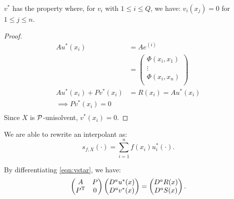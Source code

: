 \documentclass[twoside]{memoir}
\begin{document}
\begin{lem}
	$v^*$ has the property where, for $v_i$ with $1 \leq i \leq Q$, we have: $v_i(x_j) = 0$ for $1 \leq j \leq n$.
\end{lem}
\begin{proof}
	\begin{equation*}
	\begin{split}
	A u^*(x_i) &= A e^{(i)} \\
	&= \begin{pmatrix}
	\Phi(x_i, x_1) \\  \vdots \\ \Phi(x_i, x_n)\\
	\end{pmatrix} \\
	A u^*(x_i) + P v^*(x_i) &= R(x_i) = A u^*(x_i) \\
	\implies P v^*(x_i) = 0 \\
	\end{split}
	\end{equation*}
	Since $X$ is $\mathcal{P}$-unisolvent, $v^*(x_i) = 0$.
\end{proof}
We are able to rewrite an interpolant as:
\begin{equation} \label{eqn:InterDecomp}
s_{f,X}(\cdot) = \sum_{i=1}^{n} f(x_i)u_i^*(\cdot).
\end{equation}

By differentiating \ref{eqn:vstar}, we have:
\begin{equation}
\begin{pmatrix}
A & P \\
P^{\text{T}} & 0 \\
\end{pmatrix}
\begin{pmatrix}
D^a u^*(x)\\ D^a v^*(x)
\end{pmatrix}
=
\begin{pmatrix}
D^a R(x)\\ D^a S(x)
\end{pmatrix}.
\end{equation}
\end{document}
